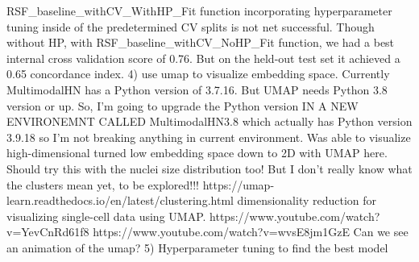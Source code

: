 \documentclass{article}%
\begin{document}
\newline%
\newline%
%
RSF\_baseline\_withCV\_WithHP\_Fit function incorporating hyperparameter tuning inside of the predetermined CV splits is not net successful. %
\newline%
\newline%
%
Though without HP, with RSF\_baseline\_withCV\_NoHP\_Fit function, we had a best internal cross validation score of 0.76. But on the held{-}out test set it achieved a 0.65 concordance index. %
\newline%
\newline%
%
4) use umap to visualize embedding space. %
\newline%
\newline%
%
Currently MultimodalHN has a Python version of 3.7.16. But UMAP needs Python 3.8 version or up. %
\newline%
\newline%
%
So, I’m going to upgrade the Python version IN A NEW ENVIRONEMNT CALLED MultimodalHN3.8 which actually has Python version 3.9.18 so I’m not breaking anything in current environment. %
\newline%
\newline%
%
Was able to visualize high{-}dimensional turned low embedding space down to 2D with UMAP here. Should try this with the nuclei size distribution too! %
\newline%
\newline%
%
But I don’t really know what the clusters mean yet, to be explored!!! %
\newline%
\newline%
%
https://umap{-}learn.readthedocs.io/en/latest/clustering.html %
\newline%
\newline%
%
dimensionality reduction for visualizing single{-}cell data using UMAP.%
\newline%
\newline%
%
https://www.youtube.com/watch?v=YevCnRd61f8 %
\newline%
\newline%
%
https://www.youtube.com/watch?v=wvsE8jm1GzE%
\newline%
\newline%
%
Can we see an animation of the umap?%
\newline%
\newline%
%
5) Hyperparameter tuning to find the best model %
\newline%
\newline%
\end{document}
